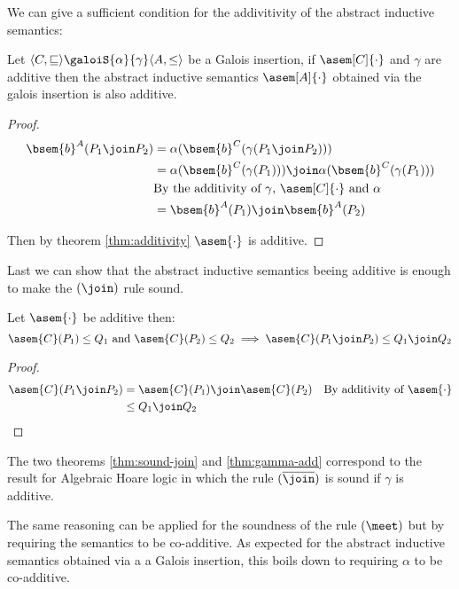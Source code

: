 We can give a sufficient condition for the addivitivity of the abstract 
inductive semantics:
\begin{theorem}
  \label{thm:gamma-add}
  Let $\langle C, \sqsubseteq \rangle \galoiS{\alpha}{\gamma} \langle A, \leq 
  \rangle$ be a Galois insertion, if $\asem[C]{\cdot}$ and $\gamma$ are 
  additive then the abstract inductive semantics $\asem[A]{\cdot}$ obtained
  via the galois insertion is also additive.
\end{theorem}
\begin{proof}
  \begin{align*}
    \bsem{b}^A(P_1 \join P_2)
      &= \alpha(\bsem{b}^C(\gamma(P_1 \join P_2))) \\
      &= \alpha(\bsem{b}^C(\gamma(P_1))) \join\alpha(\bsem{b}^C(\gamma(P_1))) \\
      &\text{By the additivity of $\gamma$, $\asem[C]{\cdot}$ and $\alpha$}\\
      &= \bsem{b}^A(P_1) \join \bsem{b}^A(P_2)
  \end{align*}

  Then by theorem \ref{thm:additivity} $\asem{\cdot}$ is additive.
\end{proof}

Last we can show that the abstract inductive semantics beeing additive is 
enough to make the $(\join)$ rule sound.

\begin{theorem}
  \label{thm:sound-join}
  Let $\asem{\cdot}$ be additive then:
  $$\asem{C}(P_1) \leq Q_1 \text{ and } \asem{C}(P_2) \leq Q_2 \implies
  \asem{C}(P_1 \join P_2) \leq Q_1 \join Q_2$$
\end{theorem}
\begin{proof}
  \begin{align*}
    \asem{C}(P_1 \join P_2)
      &= \asem{C}(P_1) \join \asem{C}(P_2)
      &\text{By additivity of $\asem{\cdot}$} \\
      &\leq Q_1 \join Q_2
  \end{align*}
\end{proof}

The two theorems \ref{thm:sound-join} and \ref{thm:gamma-add} correspond to the
result for Algebraic Hoare logic in which the rule $(\overline{\join})$ is sound
if $\gamma$ is additive.

The same reasoning can be applied for the soundness of the rule $(\meet)$ but
by requiring the semantics to be co-additive. As expected for the abstract
inductive semantics obtained via a a Galois insertion, this boils down to 
requiring $\alpha$ to be co-additive.


